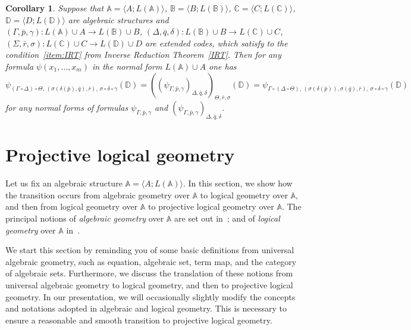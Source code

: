 \documentclass[12pt]{article}
\newtheorem{corollary}{Corollary}
\theoremstyle{definition}
\def\MA{{\mathbb{A}}}
\def\MB{{\mathbb{B}}}
\def\MC{{\mathbb{C}}}
\def\MD{{\mathbb{D}}}
\begin{document}
\begin{corollary}\label{ABCD_ext}
    Suppose that $\MA=\langle A; L(\MA)\rangle$, $\MB=\langle B; L(\MB)\rangle$, $\MC=\langle C; L(\MC)\rangle$, $\MD=\langle D; L(\MD)\rangle$ are algebraic structures and $(\Gamma,\bar p,\gamma)\colon L(\MA)\cup A\to L(\MB)\cup B$, $(\Delta,\bar q,\delta)\colon L(\MB)\cup B\to L(\MC)\cup C$, $(\Sigma,\bar r,\sigma)\colon L(\MC)\cup C\to L(\MD)\cup D$ are extended codes, which satisfy to the condition~\ref{item:IRT} from Inverse Reduction Theorem~\ref{IRT}. Then for any formula $\psi(x_1,\ldots,x_m)$ in the normal form $L(\MA)\cup A$ one has
\begin{equation*}
\psi_{(\Gamma\circ\Delta)\circ\Theta,\,(\sigma(\delta({\bar p}),\bar q),\bar r),\,\sigma\circ\delta\circ\gamma}(\MD)= ((\psi_{\Gamma,\bar p, \gamma})_{\Delta,\bar q, \delta})_{\Theta,\bar r,\sigma}(\MD) = \psi_{\Gamma\circ(\Delta\circ\Theta),\,(\sigma(\delta({\bar p})),\sigma(\bar q),\bar r),\,\sigma\circ\delta\circ\gamma}(\MD)
\end{equation*}
for any normal forms of formulas $\psi_{\Gamma,\bar p, \gamma}$ and $(\psi_{\Gamma,\bar p, \gamma})_{\Delta,\bar q, \delta}$.
\end{corollary}

\section{Projective logical geometry}\label{sec:proj}

Let us fix an algebraic structure $\MA=\langle A; L(\MA)\rangle$. In this section, we show how the transition occurs from algebraic geometry over $\MA$ to logical geometry over $\MA$, and then from logical geometry over $\MA$ to projective logical geometry over $\MA$. 
The principal notions of {\em  algebraic geometry} over $\MA$ are set out in~\cite{DMR1, DMR2, DMR5, DMR6, Monograph, Plotkin1, Plotkin2, Plotkin3, Plotkin4}; and of {\em logical geometry} over $\MA$ in~\cite{Plotkin7, Plotkin8, Plotkin9, Plotkin6, Plotkin10, Plotkin5}.

We start this section by reminding you of some basic definitions from universal algebraic geometry, such as equation, algebraic set, term map, and the category of algebraic sets. Furthermore, we discuss the translation of these notions from universal algebraic geometry to logical geometry, and then to projective logical geometry. In our presentation, we will occasionally slightly modify the concepts and notations adopted in algebraic and logical geometry. This is necessary to ensure a reasonable and smooth transition to projective logical geometry.
\end{document}
